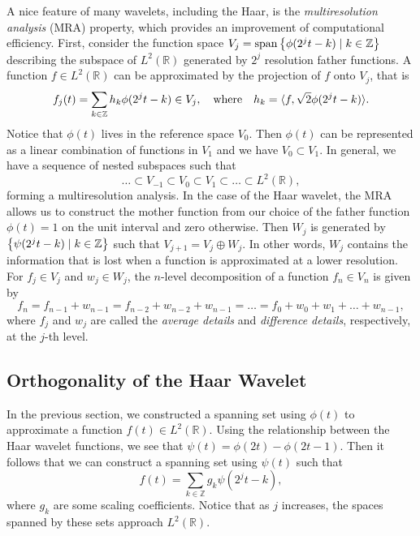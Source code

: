 \documentclass{article}
\DeclarePairedDelimiter{\iprod}{\langle}{\rangle}
\def\RR{\mathbb{R}}
\def\ZZ{\mathbb{Z}}
\DeclareMathOperator{\spans}{span}
\theoremstyle{definition}
\begin{document}
  A nice feature of many wavelets, including the Haar, is the \textit{multiresolution analysis} (MRA) property, which provides an improvement of computational efficiency. First, consider the function space \(V_j = \spans\qty{\phi(2^jt-k) \mid k \in \ZZ}\) describing the subspace of \(L^2(\mathbb{R})\) generated by \(2^j\) resolution father functions. A function \(f \in L^2(\RR)\) can be approximated by the projection of \(f\) onto \(V_j\), that is
  \begin{equation} \label{eqn:proj-f-onto-vj}
    f_j(t) = \sum_{k \in \ZZ} h_k \phi(2^jt-k) \in V_j, 
    \qq{where}
    h_k = \iprod{f,\sqrt{2}\phi(2^jt-k)}.
  \end{equation}
  Notice that \(\phi(t)\) lives in the reference space \(V_0\). Then \(\phi(t)\) can be represented as a linear combination of functions in \(V_1\) and we have \(V_0 \subset V_1\). In general, we have a sequence of nested subspaces such that
  \begin{equation} \label{eqn:mra}
    \dots \subset V_{-1} \subset V_0 \subset V_1 \subset \dots \subset L^2(\mathbb{R}),
  \end{equation}
  forming a multiresolution analysis. In the case of the Haar wavelet, the MRA allows us to construct the mother function from our choice of the father function \(\phi(t) = 1\) on the unit interval and zero otherwise. Then \(W_j\) is generated by \(\qty{\psi(2^jt-k) \mid k \in \ZZ}\) such that \(V_{j+1} = V_j \oplus W_j\). In other words, \(W_j\) contains the information that is lost when a function is approximated at a lower resolution. For \(f_j \in V_j\) and \(w_j \in W_j\), the \(n\)-level decomposition of a function \(f_n \in V_n\) is given by
  \[f_n = f_{n-1} + w_{n-1} = f_{n-2} + w_{n-2} + w_{n-1} = \dots = f_0 + w_0 + w_1 + \dots + w_{n-1},\]
  where \(f_j\) and \(w_j\) are called the \textit{average details} and \textit{difference details}, respectively, at the \(j\)-th level.

  \subsection{Orthogonality of the Haar Wavelet}

  In the previous section, we constructed a spanning set using \(\phi(t)\) to approximate a function \(f(t) \in L^2(\RR)\). Using the relationship between the Haar wavelet functions, we see that \(\psi(t) = \phi(2t) - \phi(2t-1)\). Then it follows that we can construct a spanning set using \(\psi(t)\) such that
  \begin{equation} \label{eqn:proj-f-onto-wj}
    f(t) = \sum_{k \in \ZZ} g_k \psi(2^jt-k),
  \end{equation}
  where \(g_k\) are some scaling coefficients. Notice that as \(j\) increases, the spaces spanned by these sets approach \(L^2(\RR)\).
\end{document}
